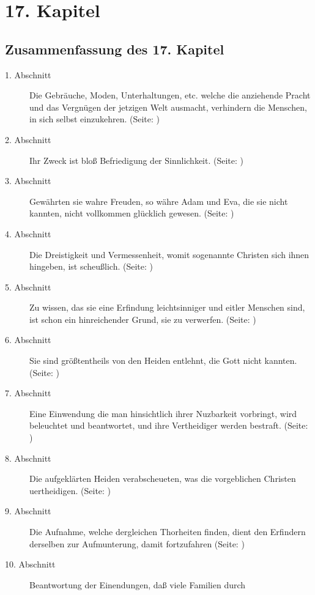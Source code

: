 

\chapter{17. Kapitel} \label{kap17}
\section{Zusammenfassung des 17. Kapitel}
\small
\begin{description}
\item[1. Abschnitt] Die Gebräuche, Moden, Unterhaltungen, etc. welche die
anziehende Pracht und das Vergnügen der jetzigen Welt ausmacht, verhindern die
Menschen, in sich selbst einzukehren. (Seite: \pageref{kap17_ab1})
\item[2. Abschnitt] Ihr Zweck ist bloß Befriedigung der Sinnlichkeit. (Seite: \pageref{kap17_ab2})
\item[3. Abschnitt] Gewährten sie wahre Freuden, so währe Adam und Eva, die sie
nicht kannten, nicht vollkommen glücklich gewesen. (Seite: \pageref{kap17_ab3})
\item[4. Abschnitt] Die Dreistigkeit und Vermessenheit, womit sogenannte
Christen sich ihnen hingeben, ist scheußlich. (Seite: \pageref{kap17_ab4})
\item[5. Abschnitt] Zu wissen, das sie eine Erfindung leichtsinniger und eitler
Menschen sind, ist schon ein hinreichender Grund, sie zu verwerfen. (Seite: \pageref{kap17_ab5})
\item[6. Abschnitt] Sie sind größtentheils von den Heiden entlehnt, die Gott
nicht kannten. (Seite: \pageref{kap17_ab6})
\item[7. Abschnitt] Eine Einwendung die man hinsichtlich ihrer Nuzbarkeit
vorbringt, wird beleuchtet und beantwortet, und ihre Vertheidiger werden
bestraft. (Seite: \pageref{kap17_ab7})
\item[8. Abschnitt] Die aufgeklärten Heiden verabscheueten, was die vorgeblichen
Christen uertheidigen. (Seite: \pageref{kap17_ab8})
\item[9. Abschnitt] Die Aufnahme, welche dergleichen Thorheiten finden, dient
den Erfindern derselben zur Aufmunterung, damit fortzufahren (Seite: \pageref{kap17_ab9})
\item[10. Abschnitt] Beantwortung der Einendungen, daß viele Familien durch

\end{description}
